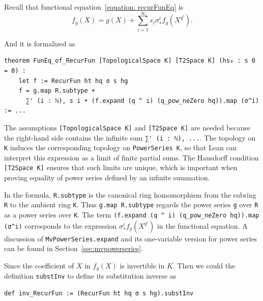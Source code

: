 Recall that functional equation~\eqref{equation: recurFunEq} is
\[f_g(X) = g(X) + \sum_{i=1}^{\infty} s_i \sigma_*^i f_g (X^{q ^ i}).\]

And it is formalized as

\begin{lstlisting}
theorem FunEq_of_RecurFun [TopologicalSpace K] [T2Space K] (hs₀ : s 0 = 0) :
    let f := RecurFun ht hq σ s hg
    f = g.map R.subtype +
      ∑' (i : ℕ), s i • (f.expand (q ^ i) (q_pow_neZero hq)).map (σ^i) := ...
\end{lstlisting}


The assumptions \lstinline|[TopologicalSpace K]| and \lstinline|[T2Space K]|
are needed because the right-hand side contains the infinite sum
\lstinline|∑' (i : ℕ), ...|.  The topology on \lstinline|K| induces the
corresponding topology on \lstinline|PowerSeries K|, so that Lean can
interpret this expression as a limit of finite partial sums.  The
Hausdorff condition \lstinline|[T2Space K]| ensures that such limits are
unique, which is important when proving equality of power series defined
by an infinite summation.

In the formula, \lstinline|R.subtype| is the canonical ring homomorphism
from the subring \lstinline|R| to the ambient ring \lstinline|K|.  Thus
\lstinline|g.map R.subtype| regards the power series \lstinline|g| over
\lstinline|R| as a power series over \lstinline|K|.
The term \lstinline|(f.expand (q ^ i) (q_pow_neZero hq)).map (σ^i)|
corresponds to the expression $\sigma_*^i f_g (X^{q ^ i})$ in the
functional equation.  A discussion of \lstinline|MvPowerSeries.expand|
and its one-variable version for power series can be found in
Section~\ref{sec:mvpowerseries}.

Since the coefficient of $X$ in $f_g(X)$ is invertible in $K$.
Then we could the definition \lstinline|substInv| to define its substitution
inverse as

\begin{lstlisting}
def inv_RecurFun := (RecurFun ht hq σ s hg).substInv
\end{lstlisting}

